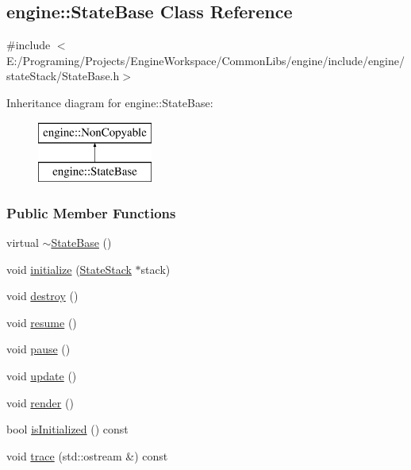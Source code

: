 \hypertarget{a00072}{}\subsection{engine\+:\+:State\+Base Class Reference}
\label{a00072}


{\ttfamily \#include $<$E\+:/\+Programing/\+Projects/\+Engine\+Workspace/\+Common\+Libs/engine/include/engine/state\+Stack/\+State\+Base.\+h$>$}

Inheritance diagram for engine\+:\+:State\+Base\+:\begin{figure}[H]
\begin{center}
\leavevmode
\includegraphics[height=2.000000cm]{a00072}
\end{center}
\end{figure}
\subsubsection*{Public Member Functions}
\begin{DoxyCompactItemize}
\item 
virtual \hyperlink{a00072_ab664691d7ef22f9764816ab9aaf7d537}{$\sim$\+State\+Base} ()
\item 
void \hyperlink{a00072_aa80ea4f74acd99c5b51d61e397b84e0b}{initialize} (\hyperlink{a00073}{State\+Stack} $\ast$stack)
\item 
void \hyperlink{a00072_a28c40b43d8852235b3f2ea4ca39c0cad}{destroy} ()
\item 
void \hyperlink{a00072_a7a109867f252655aa625f8421071fa23}{resume} ()
\item 
void \hyperlink{a00072_acc1a281ee5cd9192fb7a703c5ef8c49b}{pause} ()
\item 
void \hyperlink{a00072_a90b80b1002ed942c2f3b8dd9965cfba0}{update} ()
\item 
void \hyperlink{a00072_a0e52521456a98ab4b8a58ba01d356836}{render} ()
\item 
bool \hyperlink{a00072_a73a808c7f866e21ab85b694d726159eb}{is\+Initialized} () const 
\item 
void \hyperlink{a00072_a369f9b474222dfe2109e6d15630157db}{trace} (std\+::ostream \&) const 
\end{DoxyCompactItemize}

